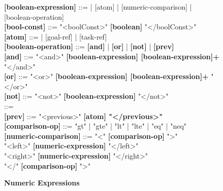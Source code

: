 \begin{figure}[p]
\begin{tcolorbox}[title=iStar-DT-X Grammar,colbacktitle=orange!40!white,coltitle=black,fonttitle=\bfseries,adjusted title=iStarDT-X Grammar (1/3),halign title=flush center]
\begin{scriptsize}
\begin{tabbing}
\textbf{[boolean-expression]} \> ::=  | [atom] | [numeric-comparison] | [boolean-operation]\\
\textbf{[bool-const]} \> ::= "<boolConst>" \textbf{[boolean]} "</boolConst>" \\
\textbf{[atom]} \> ::=  | [goal-ref] | [task-ref] \\
\textbf{[boolean-operation]} \> ::= \> \textbf{[and]} | \textbf{[or]} | \textbf{[not]} |  \textbf{[prev]}\\
\textbf{[and]} \> ::= \> "<and>" \textbf{[boolean-expression] [boolean-expression]+} "</and>"\\
\textbf{[or]}  \> ::=  \> "<or>" \textbf{[boolean-expression] [boolean-expression]+} "</or>"\\
\textbf{[not]} \> ::= \> "<not>" \textbf{[boolean-expression]} "</not>"\\
\red{[implies]}  \> ::=  \> \\

\textbf{[prev]} \> ::= "<previous>" \textbf{[atom] "</previous>"} \\
\textbf{[comparison-op]} \> ::= \> "gt" | "gte" | "lt" | "lte" | "eq" | "neq"\\
\textbf{[numeric-comparison]} \> ::= \> "<" \textbf{[comparison-op]} ">" \\ 
     \> \> "<left>" \textbf{[numeric-expression]} "</left>"  \\ 
     \> \> "<right>" \textbf{[numeric-expression]} "</right>" \\ 
     \> \> "</" \textbf{[comparison-op]} ">"
\end{tabbing}
\end{scriptsize}

\vspace{-2mm}

\rmfamily
\begin{footnotesize}
\textbf{Numeric Expressions}
\end{footnotesize}
\ttfamily

\vspace{-3mm}


\end{tcolorbox}
\end{figure}
